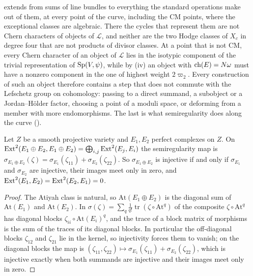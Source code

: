 \begin{remark}
\label{rem:leavel}
 extends  from sums of
line bundles to everything the standard operations make out of them, at every
point of the curve, including the CM points, where the exceptional classes
are algebraic. There the cycles that represent them are not Chern characters
of objects of $\mathcal{L}$, and neither are the two Hodge classes of $X_{c}$
in degree four that are not products of divisor classes. At a point that is
not CM, every Chern character of an object of $\mathcal{L}$ lies in the
isotypic component of the trivial representation of $\operatorname{Sp}(V,\psi)$, while by
(iv) an object with $\operatorname{ch}(E)=N\omega$ must have a
nonzero component in the one of highest weight $2\varpi_{2}$. Every
construction of such an object therefore contains a step that does not commute with the Lefschetz group on
cohomology: passing to a direct summand, a subobject or a Jordan--H\"older
factor, choosing a point of a moduli space, or deforming from a member with
more endomorphisms. The last is what semiregularity does along the curve
().
\end{remark}

\begin{lemma}\label{lem:semiregsum}
Let $Z$ be a smooth projective variety and $E_{1},E_{2}$ perfect complexes on
$Z$. On $\operatorname{Ext}^{2}(E_{1}\oplus E_{2},E_{1}\oplus E_{2})=\bigoplus_{i,j}
\operatorname{Ext}^{2}(E_{j},E_{i})$ the semiregularity map is
$\sigma_{E_{1}\oplus E_{2}}(\zeta)=\sigma_{E_{1}}(\zeta_{11})
+\sigma_{E_{2}}(\zeta_{22})$. So $\sigma_{E_{1}\oplus E_{2}}$ is injective if
and only if $\sigma_{E_{1}}$ and $\sigma_{E_{2}}$ are injective, their images
meet only in zero, and $\operatorname{Ext}^{2}(E_{1},E_{2})=\operatorname{Ext}^{2}(E_{2},E_{1})=0$.
\end{lemma}

\begin{proof}
The Atiyah class is natural, so $\mathrm{At}(E_{1}\oplus E_{2})$ is the
diagonal sum of $\mathrm{At}(E_{1})$ and $\mathrm{At}(E_{2})$. In
$\sigma(\zeta)=\sum_{q}\frac1{q!}\operatorname{tr}(\zeta\circ\mathrm{At}^{q})$
of  the composite $\zeta\circ\mathrm{At}^{q}$ has diagonal blocks
$\zeta_{ii}\circ\mathrm{At}(E_{i})^{q}$, and the trace of a block matrix of
morphisms is the sum of the traces of its diagonal blocks. In particular the
off-diagonal blocks $\zeta_{12}$ and $\zeta_{21}$ lie in the kernel, so
injectivity forces them to vanish; on the diagonal blocks the map is
$(\zeta_{11},\zeta_{22})\mapsto\sigma_{E_{1}}(\zeta_{11})+\sigma_{E_{2}}
(\zeta_{22})$, which is injective exactly when both summands are injective
and their images meet only in zero.
\end{proof}

